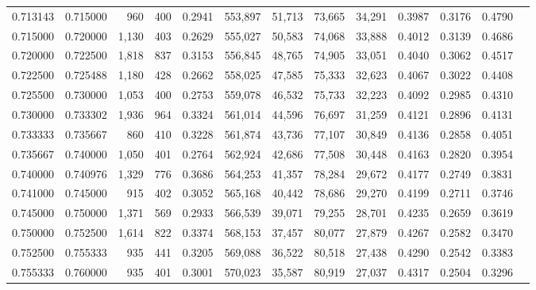 \begin{tabular}{rrrrrrrrrrrrr}
0.713143 & 0.715000 &    960 &   400 &                                     0.2941 & 553,897 &  51,713 &  73,665 &  34,291 & 0.3987 & 0.3176 & 0.4790 \\
0.715000 & 0.720000 &  1,130 &   403 &                                     0.2629 & 555,027 &  50,583 &  74,068 &  33,888 & 0.4012 & 0.3139 & 0.4686 \\
0.720000 & 0.722500 &  1,818 &   837 &                                     0.3153 & 556,845 &  48,765 &  74,905 &  33,051 & 0.4040 & 0.3062 & 0.4517 \\
0.722500 & 0.725488 &  1,180 &   428 &                                     0.2662 & 558,025 &  47,585 &  75,333 &  32,623 & 0.4067 & 0.3022 & 0.4408 \\
0.725500 & 0.730000 &  1,053 &   400 &                                     0.2753 & 559,078 &  46,532 &  75,733 &  32,223 & 0.4092 & 0.2985 & 0.4310 \\
0.730000 & 0.733302 &  1,936 &   964 &                                     0.3324 & 561,014 &  44,596 &  76,697 &  31,259 & 0.4121 & 0.2896 & 0.4131 \\
0.733333 & 0.735667 &    860 &   410 &                                     0.3228 & 561,874 &  43,736 &  77,107 &  30,849 & 0.4136 & 0.2858 & 0.4051 \\
0.735667 & 0.740000 &  1,050 &   401 &                                     0.2764 & 562,924 &  42,686 &  77,508 &  30,448 & 0.4163 & 0.2820 & 0.3954 \\
0.740000 & 0.740976 &  1,329 &   776 &                                     0.3686 & 564,253 &  41,357 &  78,284 &  29,672 & 0.4177 & 0.2749 & 0.3831 \\
0.741000 & 0.745000 &    915 &   402 &                                     0.3052 & 565,168 &  40,442 &  78,686 &  29,270 & 0.4199 & 0.2711 & 0.3746 \\
0.745000 & 0.750000 &  1,371 &   569 &                                     0.2933 & 566,539 &  39,071 &  79,255 &  28,701 & 0.4235 & 0.2659 & 0.3619 \\
0.750000 & 0.752500 &  1,614 &   822 &                                     0.3374 & 568,153 &  37,457 &  80,077 &  27,879 & 0.4267 & 0.2582 & 0.3470 \\
0.752500 & 0.755333 &    935 &   441 &                                     0.3205 & 569,088 &  36,522 &  80,518 &  27,438 & 0.4290 & 0.2542 & 0.3383 \\
0.755333 & 0.760000 &    935 &   401 &                                     0.3001 & 570,023 &  35,587 &  80,919 &  27,037 & 0.4317 & 0.2504 & 0.3296 \\

\end{tabular}
